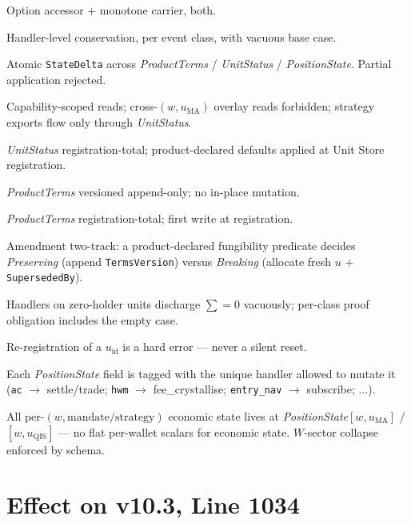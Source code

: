 \documentclass[11pt,a4paper]{article}
\begin{document}
\begin{description}[leftmargin=3.2em,labelwidth=2.8em,labelsep=0.4em,style=nextline]
\item[\textbf{C1}] Option accessor + monotone carrier, both.
\item[\textbf{C2}] Handler-level conservation, per event class, with vacuous base case.
\item[\textbf{C3}] Atomic \texttt{StateDelta} across \textit{ProductTerms} / \textit{UnitStatus} / \textit{PositionState}. Partial application rejected.
\item[\textbf{C4}] Capability-scoped reads; cross-$(w, u_{\mathrm{MA}})$ overlay reads forbidden; strategy exports flow only through \textit{UnitStatus}.
\item[\textbf{C5}] \textit{UnitStatus} registration-total; product-declared defaults applied at Unit Store registration.
\item[\textbf{C6}] \textit{ProductTerms} versioned append-only; no in-place mutation.
\item[\textbf{C7}] \textit{ProductTerms} registration-total; first write at registration.
\item[\textbf{C8}] Amendment two-track: a product-declared fungibility predicate decides \emph{Preserving} (append \texttt{TermsVersion}) versus \emph{Breaking} (allocate fresh $u$ + \texttt{SupersededBy}).
\item[\textbf{C9}] Handlers on zero-holder units discharge $\sum = 0$ vacuously; per-class proof obligation includes the empty case.
\item[\textbf{C10}] Re-registration of a $u_{\mathrm{id}}$ is a hard error --- never a silent reset.
\item[\textbf{C11}] Each \textit{PositionState} field is tagged with the unique handler allowed to mutate it (\texttt{ac} $\to$ settle/trade; \texttt{hwm} $\to$ fee\_crystallise; \texttt{entry\_nav} $\to$ subscribe; $\ldots$).
\item[\textbf{C12}] All per-$(w, \mathrm{mandate}/\mathrm{strategy})$ economic state lives at \textit{PositionState}$[w, u_{\mathrm{MA}}]$ / $[w, u_{\mathrm{QIS}}]$ --- no flat per-wallet scalars for economic state. $W$-sector collapse enforced by schema.
\end{description}

\section{Effect on v10.3, Line 1034}
\label{sec:line1034}
\end{document}
